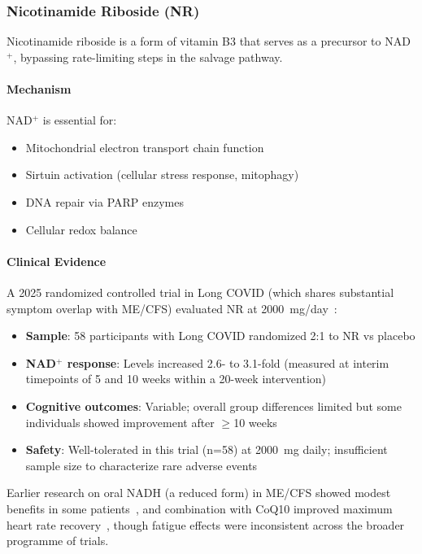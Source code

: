 \subsubsection{Nicotinamide Riboside (NR)}

Nicotinamide riboside is a form of vitamin B3 that serves as a precursor to NAD$^+$, bypassing rate-limiting steps in the salvage pathway.

\paragraph{Mechanism}
NAD$^+$ is essential for:
\begin{itemize}
    \item Mitochondrial electron transport chain function
    \item Sirtuin activation (cellular stress response, mitophagy)
    \item DNA repair via PARP enzymes
    \item Cellular redox balance
\end{itemize}

\paragraph{Clinical Evidence}
A 2025 randomized controlled trial in Long COVID (which shares substantial symptom overlap with ME/CFS) evaluated NR at 2000~mg/day~\cite{Wu2025NRLongCOVID}:
\begin{itemize}
    \item \textbf{Sample}: 58 participants with Long COVID randomized 2:1 to NR vs placebo
    \item \textbf{NAD$^+$ response}: Levels increased 2.6- to 3.1-fold (measured at interim timepoints of 5 and 10 weeks within a 20-week intervention)
    \item \textbf{Cognitive outcomes}: Variable; overall group differences limited but some individuals showed improvement after $\geq$10 weeks
    \item \textbf{Safety}: Well-tolerated in this trial (n=58) at 2000~mg daily; insufficient sample size to characterize rare adverse events
\end{itemize}

Earlier research on oral NADH (a reduced form) in ME/CFS showed modest benefits in some patients~\cite{Forsyth1999NADH}, and combination with CoQ10 improved maximum heart rate recovery~\cite{CastroMarrero2016}, though fatigue effects were inconsistent across the broader programme of trials.

